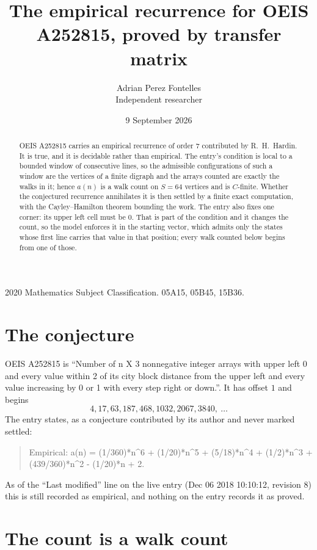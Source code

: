 \documentclass[11pt,a4paper]{article}
\title{The empirical recurrence for OEIS A252815, proved by transfer matrix}
\author{Adrian Perez Fontelles\\ \small Independent researcher}
\date{9 September 2026}
\theoremstyle{plain}
\theoremstyle{definition}
\begin{document}
\maketitle

\begin{abstract}
OEIS A252815 carries an empirical recurrence of order $7$ contributed by R.~H.~Hardin. It is
true, and it is decidable rather than empirical. The entry's condition is local to a bounded window of consecutive lines, so
the admissible configurations of such a window are the vertices of a finite digraph and the
arrays counted are exactly the walks in it; hence $a(n)$ is a walk count on $S=64$ vertices
and is $C$-finite. Whether the conjectured recurrence annihilates it is then settled by a
finite exact computation, with the Cayley--Hamilton theorem bounding the work.
 The entry also fixes one corner: its upper left cell must be $0$. That is part of the condition and it changes the count, so the model enforces it in the starting vector, which admits only the states whose first line carries that value in that position; every walk counted below begins from one of those.\end{abstract}

\noindent\small 2020 Mathematics Subject Classification. 05A15, 05B45, 15B36.\normalsize

\section{The conjecture}

OEIS A252815 is ``Number of n X 3 nonnegative integer arrays with upper left 0 and every value within 2 of its city block distance from the upper left and every value increasing by 0 or 1 with every step right or down.''. It has offset $1$ and begins
\[
4, 17, 63, 187, 468, 1032, 2067, 3840,\ \dots
\]
The entry states, as a conjecture contributed by its author and never marked settled:
\begin{quote}
Empirical: a(n) = (1/360)*n\^{}6 + (1/20)*n\^{}5 + (5/18)*n\^{}4 + (1/2)*n\^{}3 + (439/360)*n\^{}2 - (1/20)*n + 2.
\end{quote}
As of the ``Last modified'' line on the live entry (Dec 06 2018 10:10:12, revision 8) this is still
recorded as empirical, and nothing on the entry records it as proved.

\section{The count is a walk count}
\end{document}
